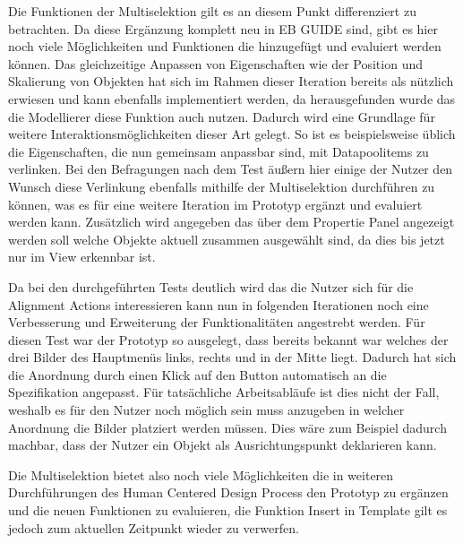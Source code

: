 Die Funktionen der Multiselektion gilt es an diesem Punkt differenziert zu betrachten.
Da diese Ergänzung komplett neu in EB GUIDE sind, gibt es hier noch viele Möglichkeiten und Funktionen die hinzugefügt und evaluiert werden können.
Das gleichzeitige Anpassen von Eigenschaften wie der Position und Skalierung von Objekten hat sich im Rahmen dieser Iteration bereits als nützlich erwiesen und kann ebenfalls implementiert werden, da herausgefunden wurde das die Modellierer diese Funktion auch nutzen.
Dadurch wird eine Grundlage für weitere Interaktionsmöglichkeiten dieser Art gelegt.
So ist es beispielsweise üblich die Eigenschaften, die nun gemeinsam anpassbar sind, mit Datapoolitems zu verlinken.
Bei den Befragungen nach dem Test äußern hier einige der Nutzer den Wunsch diese Verlinkung ebenfalls mithilfe der Multiselektion durchführen zu können, was es für eine weitere Iteration im Prototyp ergänzt und evaluiert werden kann.
Zusätzlich wird angegeben das über dem Propertie Panel angezeigt werden soll welche Objekte aktuell zusammen ausgewählt sind, da dies bis jetzt nur im View erkennbar ist.

Da bei den durchgeführten Tests deutlich wird das die Nutzer sich für die Alignment Actions interessieren kann nun in folgenden Iterationen noch eine Verbesserung und Erweiterung der Funktionalitäten angestrebt werden.
Für diesen Test war der Prototyp so ausgelegt, dass bereits bekannt war welches der drei Bilder des Hauptmenüs links, rechts und in der Mitte liegt.
Dadurch hat sich die Anordnung durch einen Klick auf den Button automatisch an die Spezifikation angepasst.
Für tatsächliche Arbeitsabläufe ist dies nicht der Fall, weshalb es für den Nutzer noch möglich sein muss anzugeben in welcher Anordnung die Bilder platziert werden müssen.
Dies wäre zum Beispiel dadurch machbar, dass der Nutzer ein Objekt als Ausrichtungspunkt deklarieren kann.

Die Multiselektion bietet also noch viele Möglichkeiten die in weiteren Durchführungen des Human Centered Design Process den Prototyp zu ergänzen und die neuen Funktionen zu evaluieren, die Funktion \glqq Insert in Template\grqq{} gilt es jedoch zum aktuellen Zeitpunkt wieder zu verwerfen.